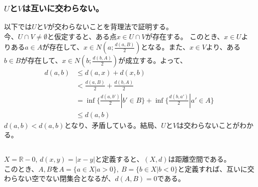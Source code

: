 \documentclass{jsarticle}
\begin{document}
\subsubsection{$U$と$V$は互いに交わらない。}
以下では$U$と$V$が交わらないことを背理法で証明する。\\
今、$U\cap V\neq\emptyset$と仮定すると、ある点$x\in U\cap V$が存在する。
このとき、$x\in U$よりある$a\in A$が存在して、$x\in N(a;\frac{d(a,B)}{2})$となる。また、$x\in V$より、ある$b\in B$が存在して、$x\in N(b;\frac{d(b,A)}{2})$が成立する。よって、
\begin{align*}
d(a,b)&\leq d(a,x)+d(x,b)\\
&< \frac{d(a,B)}{2}+\frac{d(b,A)}{2}\\
&=\inf\{\frac{d(a,b')}{2}|b'\in B\}+\inf\{\frac{d(b,a')}{2}|a'\in A\}\\
&\leq d(a,b)
\end{align*}
$d(a,b)<d(a,b)$となり、矛盾している。結局、$U$と$V$は交わらないことがわかる。

\subsection{}
$X=\mathbb{R}-{0}$, $d(x,y)=|x-y|$と定義すると、$(X, d)$は距離空間である。\\このとき、$A,B$を$A=\{a\in X|a>0\},\ B=\{b\in X|b<0\}$と定義すれば、互いに交わらない空でない閉集合となるが、$d(A,B)=0$である。

\end{document}
